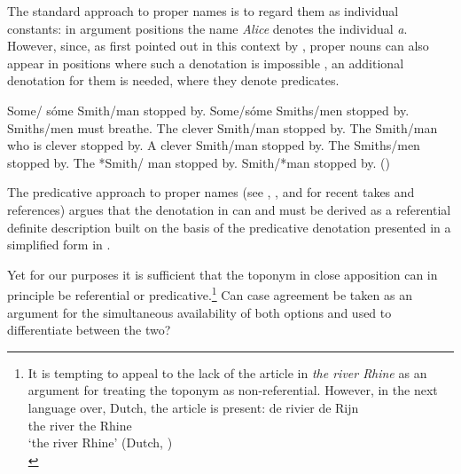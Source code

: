 \documentclass[output=paper,colorlinks,citecolor=brown]{langscibook}
\begin{document}
The standard approach to proper names is to regard them as individual constants: in argument positions the name \textit{Alice} denotes the individual \textit{a}. However, since, as first pointed out in this context by \citet{Sloat1969}, proper nouns can also appear in positions where such a denotation is impossible , an additional denotation for them is needed, where they denote predicates.\largerpage[2]

\ea\label{mat:ex:smith}
    \ea *Some/ sóme Smith/man stopped by. 
    \ex Some/sóme Smiths/men stopped by.
    \ex Smiths/men must breathe.
    \ex The clever Smith/man stopped by. 
    \ex The Smith/man who is clever stopped by. 
    \ex A clever Smith/man stopped by. 
    \ex The Smiths/men stopped by.
    \ex The *Smith/ man stopped by.
    \ex Smith/*man stopped by. \hfill (\citealt{Sloat1969})
    \z
\z

\noindent The predicative approach to proper names (see \citealt{Matushansky2008}, \citealt{Gray2015}, and \citealt{fara2015} for recent takes and references) argues that the denotation in  can and must be derived as a referential definite description built on the basis of the predicative denotation presented in a simplified form in . 

\ea\label{mat:ex:Alice}
\z
\z


\noindent Yet for our purposes it is sufficient that the toponym in close apposition can in principle be referential or predicative.\footnote{It is tempting to appeal to the lack of the article in \textit{the river Rhine} as an argument for treating the toponym as non-referential. However, in the next language over, Dutch, the article is present: 
\ea
\gll de	rivier	de	Rijn\\
the	river	the	Rhine\\
\glt `the river Rhine' \hfill (Dutch, \citealt{vanRiemsdijk1998})\\
\z
} Can case agreement be taken as an argument for the simultaneous availability of both options and used to differentiate between the two?
\end{document}
